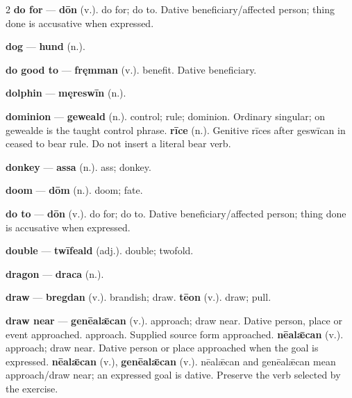 \begin{multicols}{2}
\textbf{do for} — \textbf{dōn} (v.). do for; do to. Dative beneficiary/affected person; thing done is accusative when expressed.\par
\textbf{dog} — \textbf{hund} (n.).\par
\textbf{do good to} — \textbf{fręmman} (v.). benefit. Dative beneficiary.\par
\textbf{dolphin} — \textbf{męreswīn} (n.).\par
\textbf{dominion} — \textbf{geweald} (n.). control; rule; dominion. Ordinary singular; on gewealde is the taught control phrase. \textbf{rīce} (n.). Genitive rīces after geswīcan in ceased to bear rule. Do not insert a literal bear verb.\par
\textbf{donkey} — \textbf{assa} (n.). ass; donkey.\par
\textbf{doom} — \textbf{dōm} (n.). doom; fate.\par
\textbf{do to} — \textbf{dōn} (v.). do for; do to. Dative beneficiary/affected person; thing done is accusative when expressed.\par
\textbf{double} — \textbf{twīfeald} (adj.). double; twofold.\par
\textbf{dragon} — \textbf{draca} (n.).\par
\textbf{draw} — \textbf{bregdan} (v.). brandish; draw. \textbf{tēon} (v.). draw; pull.\par
\textbf{draw near} — \textbf{genēalǣcan} (v.). approach; draw near. Dative person, place or event approached. approach. Supplied source form approached. \textbf{nēalǣcan} (v.). approach; draw near. Dative person or place approached when the goal is expressed. \textbf{nēalǣcan} (v.), \textbf{genēalǣcan} (v.). nēalǣcan and genēalǣcan mean approach/draw near; an expressed goal is dative. Preserve the verb selected by the exercise.\par

\end{multicols}
